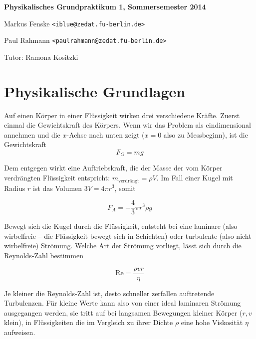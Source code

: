 \documentclass[a4paper,german,12pt,smallheadings]{scrartcl}
\begin{document}
\allowdisplaybreaks %
\begin{center}
\bfseries %
\sffamily %
\vspace{-40pt}
Physikalisches Grundpraktikum 1, Sommersemester 2014

Markus Fenske \texttt{<iblue@zedat.fu-berlin.de>}

Paul Rahmann \texttt{<paulrahmann@zedat.fu-berlin.de>}

Tutor: Ramona Kositzki
\vspace{-10pt}
\end{center}

\section*{Physikalische Grundlagen}

Auf einen Körper in einer Flüssigkeit wirken drei verschiedene Kräfte. Zuerst
einmal die Gewichtskraft des Körpers. Wenn wir das Problem als eindimensional
annehmen und die $x$-Achse nach unten zeigt ($x = 0$ also zu Messbeginn), ist
die Gewichtskraft
\begin{equation}
  F_G = mg
\end{equation}

Dem entgegen wirkt eine Auftriebskraft, die der Masse der vom Körper verdrängten
Flüssigkeit entspricht: $m_\text{verdrängt} = \rho V$. Im Fall einer Kugel mit
Radius $r$ ist das Volumen $3V = 4 \pi r^3$, somit

\begin{equation}
  F_A = -\frac{4}{3} \pi r^3 \rho g
\end{equation}

Bewegt sich die Kugel durch die Flüssigkeit, entsteht bei eine laminare (also
wirbelfreie -- die Flüssigkeit bewegt sich in Schichten) oder turbulente (also
nicht wirbelfreie) Strömung. Welche Art der Strömung vorliegt, lässt sich
durch die Reynolds-Zahl bestimmen

\begin{equation}
  \text{Re} = \frac{\rho v r}{\eta}
\end{equation}

Je kleiner die Reynolds-Zahl ist, desto schneller zerfallen auftretende
Turbulenzen. Für kleine Werte kann also von einer ideal laminaren Strömung
ausgegangen werden, sie tritt auf bei langsamen Bewegungen kleiner Körper
($r,v$ klein), in Flüssigkeiten die im Vergleich zu ihrer Dichte $\rho$ eine
hohe Viskosität $\eta$ aufweisen.
\end{document}
